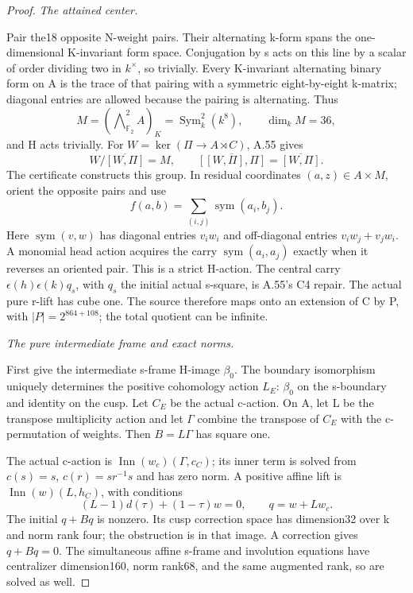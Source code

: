 \begin{proof}
\emph{The attained center.}\par
Pair the18 opposite N-weight pairs. Their alternating k-form spans
the one-dimensional K-invariant form space. Conjugation by s acts
on this line by a scalar of order dividing two in \(k^\times\),
so trivially. Every K-invariant alternating binary form on A is
the trace of that pairing with a symmetric eight-by-eight k-matrix;
diagonal entries are allowed because the pairing is alternating.
Thus
\[
 M=(\mathop{\bigwedge}\nolimits^2_{\mathbb F_2}A)_K
   =\operatorname{Sym}^2_k(k^8),\qquad\dim_kM=36,\tag{A.56.7}
\]
and H acts trivially. For \(W=\ker(\Pi\to A\rtimes C)\), A.55 gives
\[
 W/\overline{[W,\Pi]}=M,\qquad
 \overline{[[W,\Pi],\Pi]}=\overline{[W,\Pi]}.\tag{A.56.8}
\]
The certificate constructs this group. In residual coordinates
\((a,z)\in A\times M\), orient the opposite pairs and use
\[
 f(a,b)=\sum_{(i,j)}\operatorname{sym}(a_i,b_j).\tag{A.56.9}
\]
Here \(\operatorname{sym}(v,w)\) has diagonal entries \(v_iw_i\)
and off-diagonal entries \(v_iw_j+v_jw_i\). A monomial head action
acquires the carry \(\operatorname{sym}(a_i,a_j)\) exactly when it
reverses an oriented pair. This is a strict H-action. The central
carry \(\epsilon(h)\epsilon(k)q_s\), with \(q_s\) the initial
actual s-square, is A.55's C4 repair. The actual pure r-lift has cube
one. The source therefore maps onto an extension of C by P, with
\(|P|=2^{864+108}\); the total quotient can be infinite.

\emph{The pure intermediate frame and exact norms.}\par
First give the intermediate s-frame H-image \(\beta_0\).
The boundary isomorphism uniquely determines the positive
cohomology action \(L_E\): \(\beta_0\) on the s-boundary and
identity on the cusp. Let \(C_E\) be the actual c-action. On A,
let L be the transpose multiplicity action and let \(\Gamma\)
combine the transpose of \(C_E\) with the c-permutation of weights.
Then \(B=L\Gamma\) has square one.

The actual c-action is \(\operatorname{Inn}(w_c)(\Gamma,c_C)\);
its inner term is solved from \(c(s)=s\), \(c(r)=sr^{-1}s\)
and has zero norm. A positive affine lift is
\(\operatorname{Inn}(w)(L,h_C)\), with conditions
\[
 (L-1)d(\tau)+(1-\tau)w=0,\qquad q=w+Lw_c.\tag{A.56.10}
\]
The initial \(q+Bq\) is nonzero. Its cusp correction space has
dimension32 over k and norm rank four; the obstruction is in that
image. A correction gives \(q+Bq=0\). The simultaneous affine
s-frame and involution equations have centralizer dimension160,
norm rank68, and the same augmented rank, so are solved as well.


\end{proof}
